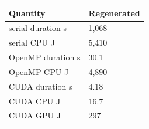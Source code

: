 \begin{tabular}{ll}
Quantity & Regenerated \\
\hline
serial duration s & 1,068 \\
serial CPU J & 5,410 \\
OpenMP duration s & 30.1 \\
OpenMP CPU J & 4,890 \\
CUDA duration s & 4.18 \\
CUDA CPU J & 16.7 \\
CUDA GPU J & 297 \\
\end{tabular}
